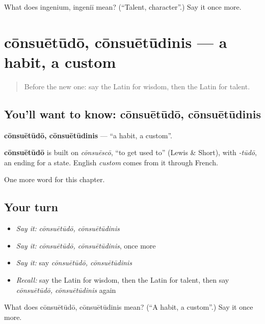 \begin{tcolorbox}[breakable,colback=teal!4,colframe=teal!35!black,title={Before you move on}]
What does ingenium, ingeniī mean? (\textquotedblleft{}Talent, character\textquotedblright{}.) Say it once more.
\end{tcolorbox}
\section[cōnsuētūdō, cōnsuētūdinis]{cōnsuētūdō, cōnsuētūdinis — a habit, a custom}

\label{lesson:LA-C206-consuetudo}



\begin{quote}
Before the new one: say the Latin for wisdom, then the Latin for talent.
\end{quote}

\subsection*{You'll want to know: cōnsuētūdō, cōnsuētūdinis}
\textbf{cōnsuētūdō, cōnsuētūdinis} — \textquotedblleft{}a habit, a custom\textquotedblright{}.

\begin{cousinweb}
\textbf{cōnsuētūdō} is built on \emph{cōnsuēscō}, \textquotedblleft{}to get used to\textquotedblright{} (Lewis \& Short), with \emph{-tūdō}, an ending for a state. English \emph{custom} comes from it through French.
\end{cousinweb}

\begin{grammarlens}[title={What you've built}]
One more word for this chapter.
\end{grammarlens}

\subsection*{Your turn}
\begin{itemize}
\raggedright
  \item \emph{Say it:} \emph{cōnsuētūdō, cōnsuētūdinis}
  \item \emph{Say it:} \emph{cōnsuētūdō, cōnsuētūdinis}, once more
  \item \emph{Say it:} say \emph{cōnsuētūdō, cōnsuētūdinis}
  \item \emph{Recall:} say the Latin for wisdom, then the Latin for talent, then say \emph{cōnsuētūdō, cōnsuētūdinis} again
\end{itemize}

\begin{tcolorbox}[breakable,colback=teal!4,colframe=teal!35!black,title={Before you move on}]
What does cōnsuētūdō, cōnsuētūdinis mean? (\textquotedblleft{}A habit, a custom\textquotedblright{}.) Say it once more.
\end{tcolorbox}
